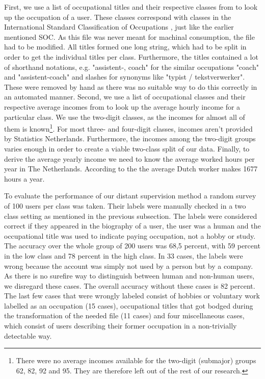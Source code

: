 \documentclass[
10pt, %
a4paper, %
oneside, %
headinclude,footinclude, %
] {book}%
\begin{document}
First, we use a list of occupational titles and their respective classes from \citet{codelijsten} to look up the occupation of a user. These classes correspond with classes in the International Standard Classification of Occupations \citep{isco}, just like the earlier mentioned SOC. As this file was never meant for machinal consumption, the file had to be modified. All titles formed one long string, which had to be split in order to get the individual titles per class. Furthermore, the titles contained a lot of shorthand notations, e.g. "assistent-, coach" for the similar occupations "coach" and "assistent-coach" and slashes for synonyms like "typist / tekstverwerker". These were removed by hand as there was no suitable way to do this correctly in an automated manner. 
Second, we use a list of occupational classes and their respective average incomes from \citet{uurlonen} to look up the average hourly income for a particular class. We use the two-digit classes, as the incomes for almost all of them is known\footnote{There were no average incomes available for the two-digit (submajor) groups 62, 82, 92 and 95. They are therefore left out of the rest of our research.}. For most three- and four-digit classes, incomes aren't provided by Statistics Netherlands. Furthermore, the incomes among the two-digit groups varies enough in order to create a viable two-class split of our data.
Finally, to derive the average yearly income we need to know the average worked hours per year in The Netherlands. According to the \citet{hours} the average Dutch worker makes 1677 hours a year.

To evaluate the performance of our distant supervision method a random survey of 100 users per class was taken. Their labels were manually checked in a two class setting as mentioned in the previous subsection. The labels were considered correct if they appeared in the biography of a user, the user was a human and the occupational title was used to indicate paying occupation, not a hobby or study. The accuracy over the whole group of 200 users was 68,5 percent, with 59 percent in the low class and 78 percent in the high class. In 33 cases, the labels were wrong because the account was simply not used by a person but by a company. As there is no surefire way to distinguish between human and non-human users, we disregard these cases. The overall accuracy without these cases is 82 percent. The last few cases that were wrongly labeled consist of hobbies or voluntary work labelled as an occupation (15 cases), occupational titles that got bodged during the transformation of the needed file (11 cases) and four miscellaneous cases, which consist of users describing their former occupation in a non-trivially detectable way.
\end{document}
